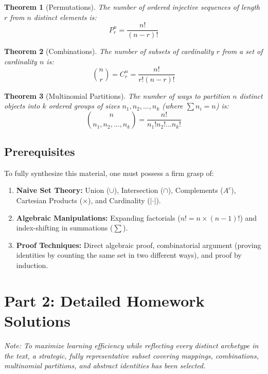 \documentclass[11pt]{article}
\theoremstyle{definition}
\theoremstyle{plain}
\newtheorem{theorem}{Theorem}[section]
\theoremstyle{remark}
\begin{document}
\begin{theorem}[Permutations]
The number of ordered injective sequences of length $r$ from $n$ distinct elements is:
\[
P^n_r = \frac{n!}{(n-r)!}
\]
\end{theorem}

\begin{theorem}[Combinations]
The number of subsets of cardinality $r$ from a set of cardinality $n$ is:
\[
\binom{n}{r} = C^n_r = \frac{n!}{r!(n-r)!}
\]
\end{theorem}

\begin{theorem}[Multinomial Partitions]
The number of ways to partition $n$ distinct objects into $k$ ordered groups of sizes $n_1, n_2, \dots, n_k$ (where $\sum n_i = n$) is:
\[
\binom{n}{n_1, n_2, \dots, n_k} = \frac{n!}{n_1! n_2! \dots n_k!}
\]
\end{theorem}

\subsection{Prerequisites}
To fully synthesize this material, one must possess a firm grasp of:
\begin{enumerate}
    \item \textbf{Naive Set Theory:} Union ($\cup$), Intersection ($\cap$), Complements ($A^c$), Cartesian Products ($\times$), and Cardinality ($| \cdot |$).
    \item \textbf{Algebraic Manipulations:} Expanding factorials ($n! = n \times (n-1)!$) and index-shifting in summations ($\sum$).
    \item \textbf{Proof Techniques:} Direct algebraic proof, combinatorial argument (proving identities by counting the same set in two different ways), and proof by induction.
\end{enumerate}

\newpage
\section{Part 2: Detailed Homework Solutions}
\textit{Note: To maximize learning efficiency while reflecting every distinct archetype in the text, a strategic, fully representative subset covering mappings, combinations, multinomial partitions, and abstract identities has been selected.}
\end{document}
